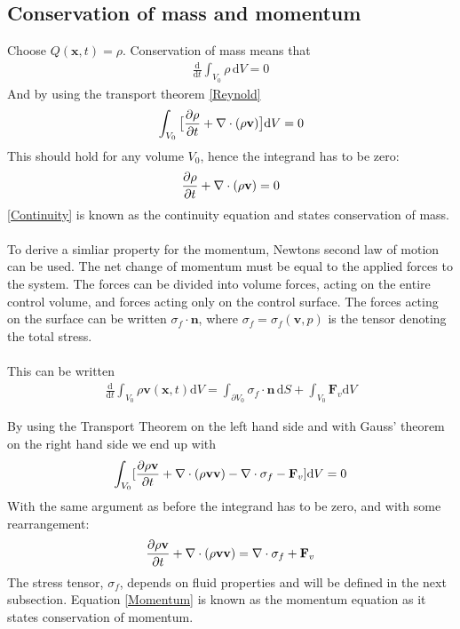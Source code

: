 \subsection{Conservation of mass and momentum}
Choose $Q(\mathbf{x},t) = \rho$. Conservation of mass means that
\begin{align*} 
\frac{\mathrm{d}}{\mathrm{d}t} \int_{V_0} \rho \, \mathrm{d}V = 0
\end{align*}
And by using the transport theorem \eqref{Reynold}
\begin{align}
\int_{V_0} \big{[}\frac{\partial \rho}{\partial t} + \nabla \cdot (\rho \mathbf{v}) \big{]}\mathrm{d}V = 0
\end{align}
This should hold for any volume $V_0$, hence the integrand has to be zero:
\begin{align} 
\frac{\partial \rho}{\partial t} + \nabla \cdot (\rho \mathbf{v}) = 0 \label{Continuity}
\end{align}
\eqref{Continuity} is known as the continuity equation and states conservation of mass. 
\\
\\
To derive a simliar property for the momentum, Newtons second law of motion can be used. The net change of momentum must be equal to the applied forces to the system. The forces can be divided into volume forces, acting on the entire control volume, and forces acting only on the control surface. The forces acting on the surface can be written $\sigma_f \cdot \mathbf{n}$, where $\sigma_f = \sigma_f(\mathbf{v}, p)$ is the tensor denoting the total stress. \\
\\
This can be written
\begin{align*} \frac{\mathrm{d}}{\mathrm{d}t} \int_{V_0} \rho \mathbf{v}(\mathbf{x},t) \mathrm{d}V = \int_{\partial V_0}\sigma_f \cdot \mathbf{n} \,\mathrm{d}S + \int_{V_0} \mathbf{F}_v \mathrm{d}V
\end{align*}

By using the Transport Theorem on the left hand side and with Gauss' theorem on the right hand side we end up with
\begin{align*} \int_{V_0} [ \frac{\partial \rho \mathbf{v}}{\partial t} + \nabla \cdot (\rho \mathbf{v}\mathbf{v} ) - \nabla \cdot \sigma_f - \mathbf{F}_v] \mathrm{d}V = 0
\end{align*}
With the same argument as before the integrand has to be zero, and with some rearrangement:
\begin{align}
\frac{\partial \rho \mathbf{v}}{\partial t} + \nabla \cdot (\rho \mathbf{v}\mathbf{v} ) = \nabla \cdot \sigma_f + \mathbf{F}_v \label{Momentum}
\end{align} 
The stress tensor, $\sigma_f$, depends on fluid properties and will be defined in the next subsection. Equation \eqref{Momentum} is known as the momentum equation as it states conservation of momentum.


